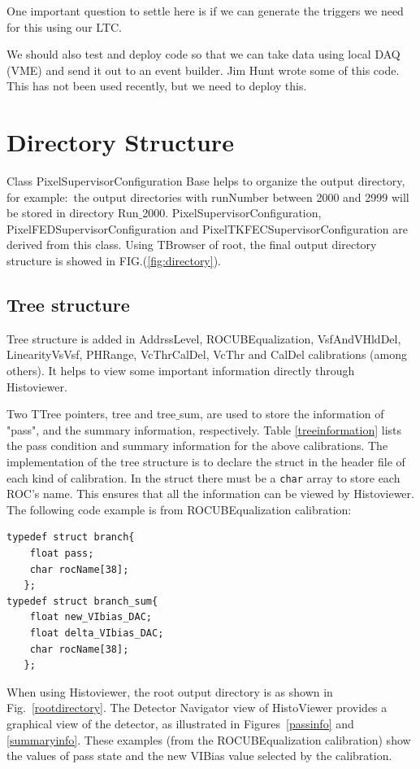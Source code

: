 One important question to settle here is if we can generate
the triggers we need for this using our LTC. 

We should also test and deploy code so that we can take 
data using local DAQ (VME) and send it out to an event builder.
Jim Hunt wrote some of this code. This has not been used
recently, but we need to deploy this.


\section{Directory Structure}\label{directorystructure}

Class PixelSupervisorConfiguration Base helps to organize the output
directory, for example$:$ the output directories with runNumber
between 2000 and 2999 will be stored in directory
Run$\_$2000. PixelSupervisorConfiguration,
PixelFEDSupervisorConfiguration and PixelTKFECSupervisorConfiguration
are derived from this class. Using TBrowser of root, the final output
directory structure is showed in FIG.(\ref{fig:directory}). 

\subsection{Tree structure}\label{treestructure}

Tree structure is added in AddrssLevel, ROCUBEqualization,
VsfAndVHldDel, LinearityVsVsf, PHRange, VcThrCalDel, VcThr and CalDel
calibrations (among others). It helps to view some important information directly
through Histoviewer.

Two TTree pointers, tree and tree$\_$sum, are used to store
the information of "pass", and the
summary information, respectively. Table \ref{treeinformation} lists the pass
condition and summary information for the above
calibrations. The implementation of the tree structure is to declare
the struct in the header file of each kind of calibration. In the struct there must be a {\tt char} array to
store each ROC's name. This ensures that all the information can be
viewed by Histoviewer. 
The following code example is from
ROCUBEqualization calibration:
\begin{verbatim}
typedef struct branch{ 
    float pass; 
    char rocName[38];
   }; 
typedef struct branch_sum{
    float new_VIbias_DAC;
    float delta_VIbias_DAC;
    char rocName[38];
   };
\end{verbatim}

When using Histoviewer, the root output directory is as shown in
Fig.~\ref{rootdirectory}. The Detector Navigator view of HistoViewer
provides a graphical view of the detector, as illustrated in
Figures~\ref{passinfo} and \ref{summaryinfo}. These examples (from the
ROCUBEqualization calibration) show the values of pass state and the
new VIBias value selected by the calibration.




